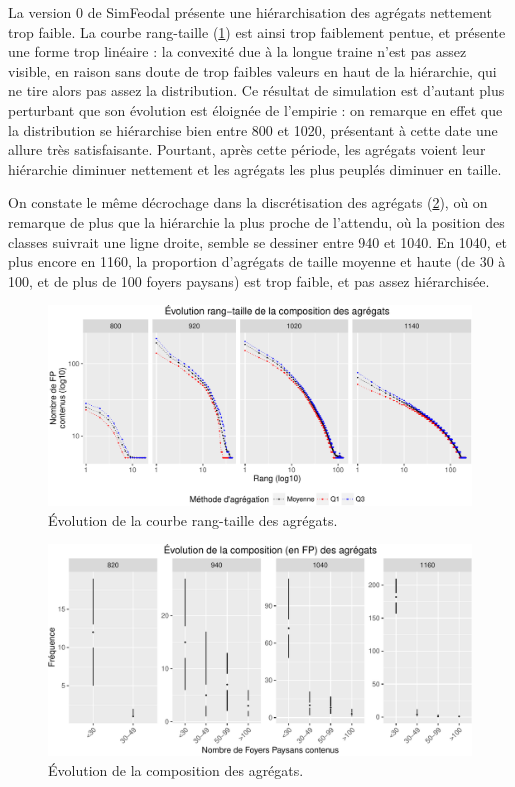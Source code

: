 \begin{mdframed}[backgroundcolor=gray!10,footnoteinside=false]
	La version 0 de SimFeodal présente une hiérarchisation des agrégats nettement trop faible. La courbe rang-taille (\cref{fig:rt-agregats-v0}) est ainsi trop faiblement pentue, et présente une forme trop linéaire : la convexité due à la longue traine n'est pas assez visible, en raison sans doute de trop faibles valeurs  en haut de la hiérarchie, qui ne \og tire\fg{} alors pas assez la distribution.
	Ce résultat de simulation est d'autant plus perturbant que son évolution est éloignée de l'empirie : on remarque en effet que la distribution se hiérarchise bien entre 800 et 1020, présentant à cette date une allure très satisfaisante. Pourtant, après cette période, les agrégats voient leur hiérarchie diminuer nettement et les agrégats les plus peuplés diminuer en taille.
	
	On constate le même décrochage dans la discrétisation des agrégats (\cref{fig:compo-agregats-v0}), où on remarque de plus que la hiérarchie la plus proche de l'attendu, où la position des classes suivrait une ligne droite, semble se dessiner entre 940 et 1040. En 1040, et plus encore en 1160, la proportion d'agrégats de taille moyenne et haute (de 30 à 100, et de plus de 100 foyers paysans) est trop faible, et pas assez hiérarchisée.
	
\end{mdframed}

\begin{figure}[H]
	\captionsetup{width=\linewidth}
	\includegraphics[width=.8\linewidth]{img/resultats/v0_rt_agregats.pdf}
	\caption{Évolution de la courbe rang-taille des agrégats.} 
	\label{fig:rt-agregats-v0} 
\end{figure}

\begin{figure}[H]
	\captionsetup{width=\linewidth}
	\includegraphics[width=.8\linewidth]{img/resultats/v0_compo_agregats.pdf}
	\caption{Évolution de la composition des agrégats.} 
	\label{fig:compo-agregats-v0} 
\end{figure}

